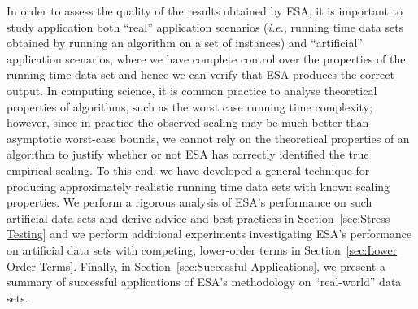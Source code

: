 \documentclass[aic]{iosart2x}
\newcommand{\ie}{\emph{i.e.}}
\begin{document}
In order to assess the quality of the results obtained by ESA, it is important to study application both ``real'' application scenarios (\ie{}, running time data sets obtained by running an algorithm on a set of instances) and ``artificial'' application scenarios, where we have complete control over the properties of the running time data set and hence we can verify that ESA produces the correct output. In computing science, it is common practice to analyse theoretical properties of algorithms, such as the worst case running time complexity; however, since in practice the observed scaling may be much better than asymptotic worst-case bounds, we cannot rely on the theoretical properties of an algorithm to justify whether or not ESA has correctly identified the true empirical scaling. To this end, we have developed a general technique for producing approximately realistic running time data sets with known scaling properties. We perform a rigorous analysis of ESA's performance on such artificial data sets and derive advice and best-practices in Section~\ref{sec:Stress Testing} and we perform additional experiments investigating ESA's performance on artificial data sets with competing, lower-order terms in Section~\ref{sec:Lower Order Terms}. Finally, in Section~\ref{sec:Successful Applications}, we present a summary of successful applications of ESA's methodology on ``real-world'' data sets. 
\end{document}
